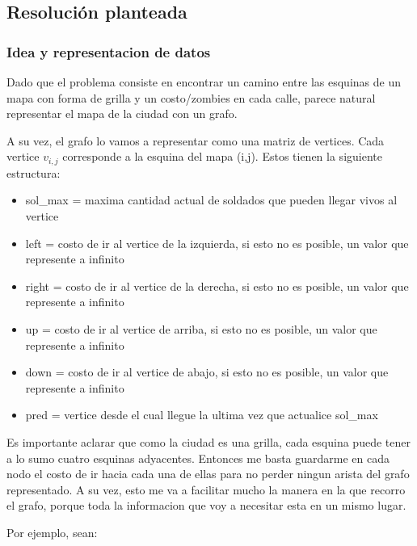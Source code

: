 \subsection{Resolución planteada}

\subsubsection{Idea y representacion de datos}

Dado que el problema consiste en encontrar un camino entre las esquinas de un mapa con forma de grilla y un costo/zombies en cada calle, parece natural representar el mapa de la ciudad con un grafo.

A su vez, el grafo lo vamos a representar como una matriz de vertices. Cada vertice $v_{i,j}$ corresponde a la esquina del mapa (i,j). Estos tienen la siguiente estructura:

\medskip
\begin{itemize}[noitemsep,nolistsep]
  \item sol_max = maxima cantidad actual de soldados que pueden llegar vivos al vertice
  \item left = costo de ir al vertice de la izquierda, si esto no es posible, un valor que represente a infinito
  \item right = costo de ir al vertice de la derecha, si esto no es posible, un valor que represente a infinito
  \item up = costo de ir al vertice de arriba, si esto no es posible, un valor que represente a infinito
  \item down = costo de ir al vertice de abajo, si esto no es posible, un valor que represente a infinito
  \item pred = vertice desde el cual llegue la ultima vez que actualice sol_max
\end{itemize}
\medskip

Es importante aclarar que como la ciudad es una grilla, cada esquina puede tener a lo sumo cuatro esquinas adyacentes. Entonces me basta guardarme en cada nodo el costo de ir hacia cada una de ellas para no perder ningun arista del grafo representado. A su vez, esto me va a facilitar mucho la manera en la que recorro el grafo, porque toda la informacion que voy a necesitar esta en un mismo lugar.

\medskip

Por ejemplo, sean:

